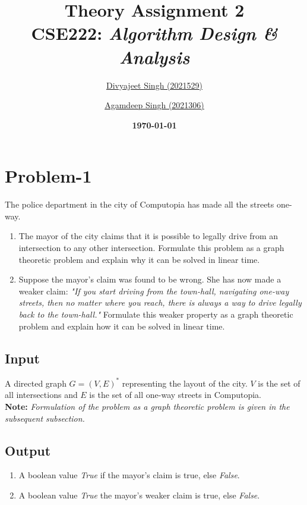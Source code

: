\documentclass[12pt]{report}
\title{
    \textbf{\Huge{Theory Assignment 2}} \\
    \vspace*{15pt}
    \large{CSE222: \textit{Algorithm Design \& Analysis}}
}
\author{
    \href{mailto:divyajeet21529@iiitd.ac.in}{Divyajeet Singh (2021529)}
    \and
    \href{mailto:agamdeep21306@iiitd.ac.in}{Agamdeep Singh (2021306)}
}
\date{
    \vspace*{10pt}
    \textbf{\today}
}
\begin{document}
    \maketitle

    \section*{\huge{Problem-1}}
    The police department in the city of Computopia has made all the streets one-way.
    \begin{enumerate}[label=(\alph*)]
        \item
        The mayor of the city claims that it is possible to legally drive from an intersection to any other intersection.
        Formulate this problem as a graph theoretic problem and explain why it can be solved in linear time.
        \item
        Suppose the mayor's claim was found to be wrong. She has now made a weaker claim:
        \textit{"If you start driving from the town-hall, navigating one-way streets, then no matter where you reach,
        there is always a way to drive legally back to the town-hall."}
        Formulate this weaker property as a graph theoretic problem and explain how it can be solved in linear time.
    \end{enumerate}

    \subsection*{Input}
    A directed graph $G = (V, E)^{*}$ representing the layout of the city.
    $V$ is the set of all intersections and $E$ is the set of all one-way streets in Computopia.
    \vspace*{10pt} \\
    \textbf{Note:} \textit{Formulation of the problem as a graph theoretic problem is given in the subsequent subsection.}

    \subsection*{Output}
    \begin{enumerate}[label=(\alph*)]
        \item
        A boolean value \textit{True} if the mayor's claim is true, else \textit{False}.
        \item
        A boolean value \textit{True} the mayor's weaker claim is true, else \textit{False}.
    \end{enumerate}
\end{document}
